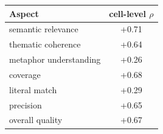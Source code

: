\begin{tabular}{lc}
\toprule
Aspect & cell-level $\rho$ \\
\midrule
semantic relevance & +0.71 \\
thematic coherence & +0.64 \\
metaphor understanding & +0.26 \\
coverage & +0.68 \\
literal match & +0.29 \\
precision & +0.65 \\
overall quality & +0.67 \\
\bottomrule
\end{tabular}
